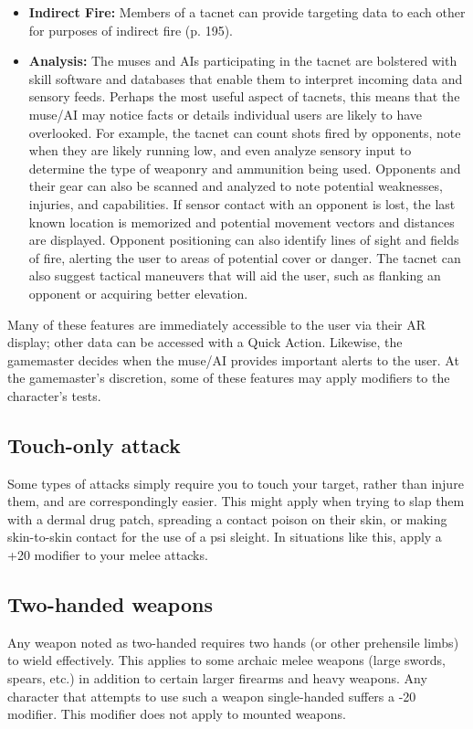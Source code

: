 \begin{itemize}
\item \textbf{Indirect Fire:} Members of a tacnet can provide targeting data to each other for purposes of indirect fire (p. 195).
\item \textbf{Analysis:} The muses and AIs participating in the tacnet are bolstered with skill software and databases that enable them to interpret incoming data and sensory feeds. Perhaps the most useful aspect of tacnets, this means that the muse/AI may notice facts or details individual users are likely to have overlooked. For example, the tacnet can count shots fired by opponents, note when they are likely running low, and even analyze sensory input to determine the type of weaponry and ammunition being used. Opponents and their gear can also be scanned and analyzed to note potential weaknesses, injuries, and capabilities. If sensor contact with an opponent is lost, the last known location is memorized and potential movement vectors and distances are displayed. Opponent positioning can also identify lines of sight and fields of fire, alerting the user to areas of potential cover or danger. The tacnet can also suggest tactical maneuvers that will aid the user, such as flanking an opponent or acquiring better elevation.
\end{itemize}

Many of these features are immediately accessible to the user via their AR display; other data can be accessed with a Quick Action. Likewise, the gamemaster decides when the muse/AI provides important alerts to the user. At the gamemaster’s discretion, some of these features may apply modifiers to the character’s tests.


\subsection{Touch-only attack}
\label{sec:touch-only-attack} Some types of attacks simply require you to touch your target, rather than injure them, and are correspondingly easier. This might apply when trying to slap them with a dermal drug patch, spreading a contact poison on their skin, or making skin-to-skin contact for the use of a psi sleight. In situations like this, apply a +20 modifier to your melee attacks.


\subsection{Two-handed weapons}
\label{sec:two-handed-weapons}

Any weapon noted as two-handed requires two hands (or other prehensile limbs) to wield effectively. This applies to some archaic melee weapons (large swords, spears, etc.) in addition to certain larger firearms and heavy weapons. Any character that attempts to use such a weapon single-handed suffers a -20 modifier. This modifier does not apply to mounted weapons.


